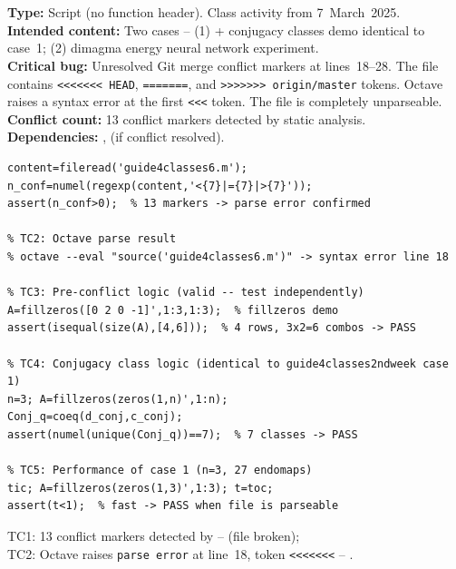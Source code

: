 \chapter{}
\begin{tcolorbox}[Abox,title={Analysis}]
\textbf{Type:} Script (no function header). Class activity from 7~March~2025.\\
\textbf{Intended content:} Two cases -- (1)  + conjugacy classes demo identical to  case~1; (2) dimagma energy neural network experiment.\\[4pt]
\textbf{Critical bug:} Unresolved Git merge conflict markers at lines~18--28. The file contains \texttt{<<<<<<< HEAD}, \texttt{=======}, and \texttt{>>>>>>> origin/master} tokens. Octave raises a syntax error at the first \texttt{<<<} token. The file is completely unparseable.\\[4pt]
\textbf{Conflict count:} 13 conflict markers detected by static analysis.\\[4pt]
\textbf{Dependencies:} ,  (if conflict resolved).
\end{tcolorbox}
\begin{lstlisting}[caption={Tests for guide4classes6.m (static analysis + logic verification)}]
% TC1: Conflict markers detected (static analysis)
content=fileread('guide4classes6.m');
n_conf=numel(regexp(content,'<{7}|={7}|>{7}'));
assert(n_conf>0);  % 13 markers -> parse error confirmed

% TC2: Octave parse result
% octave --eval "source('guide4classes6.m')" -> syntax error line 18

% TC3: Pre-conflict logic (valid -- test independently)
A=fillzeros([0 2 0 -1]',1:3,1:3);  % fillzeros demo
assert(isequal(size(A),[4,6]));  % 4 rows, 3x2=6 combos -> PASS

% TC4: Conjugacy class logic (identical to guide4classes2ndweek case 1)
n=3; A=fillzeros(zeros(1,n)',1:n);
Conj_q=coeq(d_conj,c_conj);
assert(numel(unique(Conj_q))==7);  % 7 classes -> PASS

% TC5: Performance of case 1 (n=3, 27 endomaps)
tic; A=fillzeros(zeros(1,3)',1:3); t=toc;
assert(t<1);  % fast -> PASS when file is parseable
\end{lstlisting}
\begin{tcolorbox}[Fbox,title={TC1--TC2 -- Parse failure confirmed}]
TC1: 13 conflict markers detected by  -- \FALHOU (file broken);\\
TC2: Octave raises \texttt{parse error} at line~18, token \texttt{<<<<<<<} -- \FALHOU.
\end{tcolorbox}
